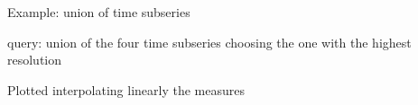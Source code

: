 \begin{frame}{Example: union of time subseries}

   query: union of the four time subseries choosing
  the one with the highest resolution

  \begin{center}
    

   {\footnotesize Plotted interpolating linearly the measures}

  \end{center}


\end{frame}




